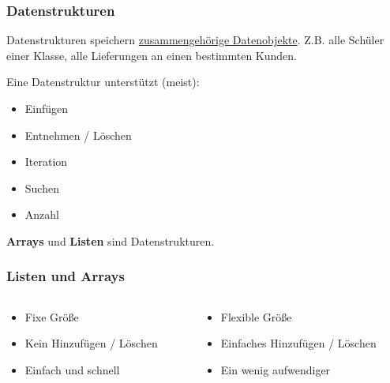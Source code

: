 \begin{multicols}{2}

\begin{frame}[fragile]
\frametitle<presentation>{Datenstrukturen}
Datenstrukturen speichern \uline{zusammengehörige Datenobjekte}.
Z.B. alle Schüler einer Klasse, alle Lieferungen an einen bestimmten Kunden.

\vspace{1ex}

Eine Datenstruktur unterstützt (meist):
\begin{itemize}
\item Einfügen
\item Entnehmen / Löschen
\item Iteration
\item Suchen
\item Anzahl
\end{itemize}

\textbf{Arrays} und \textbf{Listen} sind Datenstrukturen.
\end{frame}



\begin{frame}[fragile]
\frametitle<presentation>{Listen und Arrays}

\vspace{0pt}
\begin{columns}[c]\begin{column}{0.45 \textwidth}

\begin{itemize}
\item Fixe Größe
\item Kein Hinzufügen / Löschen
\item Einfach und schnell
\end{itemize}
\end{column}\begin{column}{0.49 \textwidth}
\pause%

\begin{itemize}
\item Flexible Größe
\item Einfaches Hinzufügen / Löschen
\item Ein wenig aufwendiger 
\end{itemize}
\end{column}\end{columns}


\end{frame}
\end{multicols}
